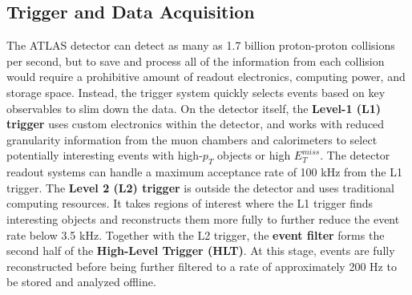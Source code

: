 \subsection{Trigger and Data Acquisition}
The ATLAS detector can detect as many as 1.7 billion proton-proton collisions per second, but to save and process all of the information from each collision would require a prohibitive amount of readout electronics, computing power, and storage space. Instead, the trigger system quickly selects events based on key observables to slim down the data.  On the detector itself, the \textbf{Level-1 (L1) trigger} uses custom electronics within the detector, and works with reduced granularity information from the muon chambers and calorimeters to select potentially interesting events with high-$p_T$ objects or high $E^{miss}_T$. The detector readout systems can handle a maximum acceptance rate of 100 kHz from the L1 trigger. The \textbf{Level 2 (L2) trigger} is outside the detector and uses traditional computing resources. It takes regions of interest where the L1 trigger finds interesting objects and reconstructs them more fully to further reduce the event rate below 3.5 kHz. Together with the L2 trigger, the \textbf{event filter} forms the second half of the \textbf{High-Level Trigger (HLT)}. At this stage, events are fully reconstructed before being further filtered to a rate of approximately 200 Hz to be stored and analyzed offline.
